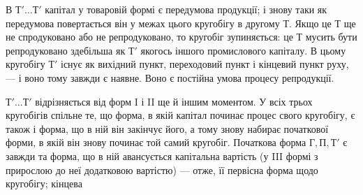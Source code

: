 В $Т'\dots{} Т'$ капітал у товаровій формі є передумова продукції; і знову таки як передумова повертається
він у межах цього кругобігу в другому $Т$. Якщо це $Т$ ще не спродуковано або не репродуковано, то
кругобіг зупиняється: це $Т$ мусить бути репродуковано здебільша як $Т'$ якогось іншого промислового
капіталу. В цьому кругобігу $Т'$ існує як вихідний пункт, переходовий пункт і кінцевий пункт руху, — і
воно тому завжди є наявне. Воно є постійна умова процесу репродукції.

$Т'\dots{} Т'$ відрізняється від форм I і II ще й іншим моментом. У всіх трьох кругобігів спільне те, що
форма, в якій капітал починає процес свого кругобігу, є також і форма, що в ній він закінчує його, а
тому знову набирає початкової форми, в якій він знову починає той самий кругобіг. Початкова форма $Г,
П, Т'$ є завжди та форма, що в ній авансується капітальна вартість (у III формі з прирослою до неї
додатковою вартістю) — отже, її первісна форма щодо кругобігу; кінцева
\parbreak{}  %
